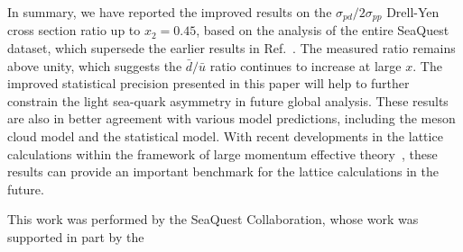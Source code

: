 \documentclass[reprint,aps,unsortedaddress,superscriptaddress,prl,floatfix,showpacs,linenumbers,final]{revtex4-2}
\begin{document}
In summary, we have reported the improved results on the $\sigma_{pd}/2\sigma_{pp}$ Drell-Yen cross section ratio up to $x_2=0.45$,
based on the analysis of the entire SeaQuest dataset, which supersede the earlier results in Ref.~\cite{dove2021,dove2023}.
The measured ratio remains above unity, which suggests the $\bar{d}/\bar{u}$ ratio continues to increase at large $x$.
The improved statistical precision presented in this paper will help to further constrain the light sea-quark asymmetry in future global analysis.
These results are also in better agreement with various model predictions, including the meson cloud model and the statistical model.
With recent developments in the lattice calculations within the framework of large momentum effective theory~\cite{constantinou2021},
these results can provide an important benchmark for the lattice calculations in the future.
\begin{acknowledgments}
	This work was performed by the SeaQuest Collaboration, whose work was supported in part by the
\end{acknowledgments}

\end{document}
